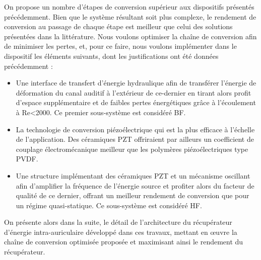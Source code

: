 On propose un nombre d'étapes de conversion supérieur aux dispositifs présentés précédemment. Bien que le système résultant soit plus complexe, le rendement de conversion au passage de chaque étape est meilleur que celui des solutions présentées dans la littérature. Nous voulons optimiser la chaîne de conversion afin de minimiser les pertes, et, pour ce faire, nous voulons implémenter dans le dispositif les éléments suivants, dont les justifications ont été données précédemment :
\begin{itemize}[label=$\square$]
	\item Une interface de transfert d'énergie hydraulique afin de transférer l'énergie de déformation du canal auditif à l'extérieur de ce-dernier en tirant alors profit d'espace supplémentaire et de faibles pertes énergétiques grâce à l'écoulement à Re<2000. Ce premier sous-système est considéré BF.
	\item La technologie de conversion piézoélectrique qui est la plus efficace à l'échelle de l'application. Des céramiques PZT offriraient par ailleurs un coefficient de couplage électromécanique meilleur que les polymères piézoélectriques type PVDF.
	\item Une structure implémentant des céramiques PZT et un mécanisme oscillant afin d'amplifier la fréquence de l'énergie source et profiter alors du facteur de qualité de ce dernier, offrant un meilleur rendement de conversion que pour un régime quasi-statique. Ce sous-système est considéré HF.
\end{itemize}
On présente alors dans la suite, le détail de l'architecture du récupérateur d'énergie intra-auriculaire développé dans ces travaux, mettant en \oe{}uvre la chaîne de conversion optimisée proposée et maximisant ainsi le rendement du récupérateur.
